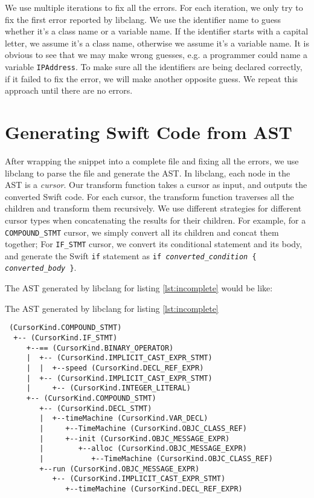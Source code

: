 \documentclass{sfuthesis}
\begin{document}
We use multiple iterations to fix all the errors. For each iteration, we only try to fix the first error reported by libclang. We use the identifier name to guess whether it's a class name or a variable name. If the identifier starts with a capital letter, we assume it's a class name, otherwise we assume it's a variable name. It is obvious to see that we may make wrong guesses, e.g. a programmer could name a variable \texttt{IPAddress}. To make sure all the identifiers are being declared correctly, if it failed to fix the error, we will make another opposite guess. We repeat this approach until there are no errors.



\section{Generating Swift Code from AST}

After wrapping the snippet into a complete file and fixing all the errors, we use libclang to parse the file and generate the AST. In libclang, each node in the AST is a \emph{cursor}. Our transform function takes a cursor as input, and outputs the converted Swift code. For each cursor, the transform function traverses all the children and transform them recursively. We use different strategies for different cursor types when concatenating the results for their children. For example, for a \texttt{COMPOUND\_STMT} cursor, we simply convert all its children and concat them together; For \texttt{IF\_STMT} cursor, we convert its conditional statement and its body, and generate the Swift \texttt{if} statement as \texttt{if \emph{converted\_condition} \{ \emph{converted\_body} \}}.

The AST generated by libclang for listing \ref{lst:incomplete} would be like:

\begin{listing}[H]
\caption{The AST generated by libclang for listing \ref{lst:incomplete}}
\label{lst:ast}
\begin{verbatim}
 (CursorKind.COMPOUND_STMT)
  +-- (CursorKind.IF_STMT)
     +--== (CursorKind.BINARY_OPERATOR)
     |  +-- (CursorKind.IMPLICIT_CAST_EXPR_STMT)
     |  |  +--speed (CursorKind.DECL_REF_EXPR)
     |  +-- (CursorKind.IMPLICIT_CAST_EXPR_STMT)
     |     +-- (CursorKind.INTEGER_LITERAL)
     +-- (CursorKind.COMPOUND_STMT)
        +-- (CursorKind.DECL_STMT)
        |  +--timeMachine (CursorKind.VAR_DECL)
        |     +--TimeMachine (CursorKind.OBJC_CLASS_REF)
        |     +--init (CursorKind.OBJC_MESSAGE_EXPR)
        |        +--alloc (CursorKind.OBJC_MESSAGE_EXPR)
        |           +--TimeMachine (CursorKind.OBJC_CLASS_REF)
        +--run (CursorKind.OBJC_MESSAGE_EXPR)
           +-- (CursorKind.IMPLICIT_CAST_EXPR_STMT)
              +--timeMachine (CursorKind.DECL_REF_EXPR)
\end{verbatim}
\end{listing}
\end{document}
